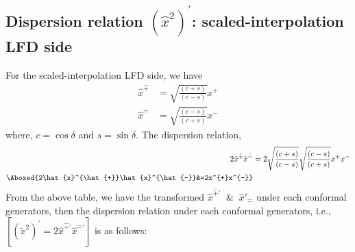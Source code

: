 \documentclass[]{article}
\numberwithin{equation}{section}
\begin{document}
{{\subsection{Dispersion relation $(\hat{x}^2)^{\prime}$: scaled-interpolation LFD side}
For the scaled-interpolation LFD side, we have
\begin{align}
    \hat{x}^{\hat{+}}&= \sqrt{\frac{(c+s)}{(c-s)}} x^{+}\\
    \hat{x}^{\hat{-}}&= \sqrt{\frac{(c-s)}{(c+s)}} x^{-}
\end{align}
where, $c=\cos{\delta}$ and $s=\sin{\delta}$. The dispersion relation,
\begin{align}
    2\hat{x}^{\hat{+}}\hat{x}^{\hat{-}}&=2\sqrt{\frac{(c+s)}{(c-s)}}\sqrt{\frac{(c-s)}{(c+s)}}x^{+}x^{-}\\
    \Aboxed{2\hat{x}^{\hat{+}}\hat{x}^{\hat{-}}&=2x^{+}x^{-}}
\end{align}
From the above table, we have the transformed $\hat{x}^{\hat{+}\prime}$ $~\&~$ $\hat{x}'_{\hat{-}}$ under each conformal generators, then the dispersion relation under each conformal generators, i.e., $[(\tilde{x}^2)^{\prime}= 2\hat{x}^{\hat{+}\prime}\hat{x}^{\hat{-}\prime}]$ is as follows:
\begin{table}[h!]
        \centering
        \label{tab:my_label}
\end{table}
\pagebreak
}}
\end{document}
